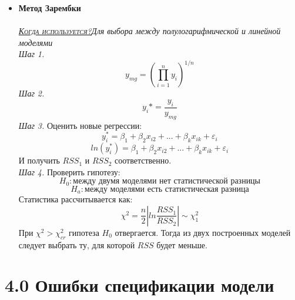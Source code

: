\documentclass[a0,final]{a0poster}
\begin{document}
\begin{multicols}{4}
\begin{itemize}
\item \textbf{Метод Зарембки}\\
\\
\underline{\textsc{\textit{Когда используется?}}}\textit{Для выбора между полулогарифмической и линейной моделями}\\
\textit{Шаг 1.} \[y_{mg} = (\prod\limits_{i=1}^ny_i)^{1/n}\]
\textit{Шаг 2.} \[y_i* = \frac{y_i}{y_{mg}}\]
\textit{Шаг 3.} Оценить новые регрессии: \\
\[y_i^* = \beta_1 + \beta_2x_{i2} + ... + \beta_{k}x_{ik} +\varepsilon_i\]
\[ln(y_i^*) = \beta_1 + \beta_2x_{i2} + ... + \beta_{k}x_{ik} +\varepsilon_i\]
И получить $RSS_1$ и $RSS_2$ соответственно.\\
\textit{Шаг 4.} Проверить гипотезу:
$$H_0: \text{между двумя моделями нет статистической разницы}$$
$$H_a: \text{между моделями есть статистическая разница} $$
Статистика рассчитывается как:
\[\chi^2 = \frac{n}{2}|ln\frac{RSS_1}{RSS_2}| \sim \chi^2_1\]
При $\chi^2 > \chi^2_{cr}$ гипотеза $H_0$ отвергается. Тогда из двух построенных моделей следует выбрать ту, для которой $RSS$ будет меньше.
\end{itemize}

\section*{4.0 Ошибки спецификации модели}

\end{multicols}
\end{document}
